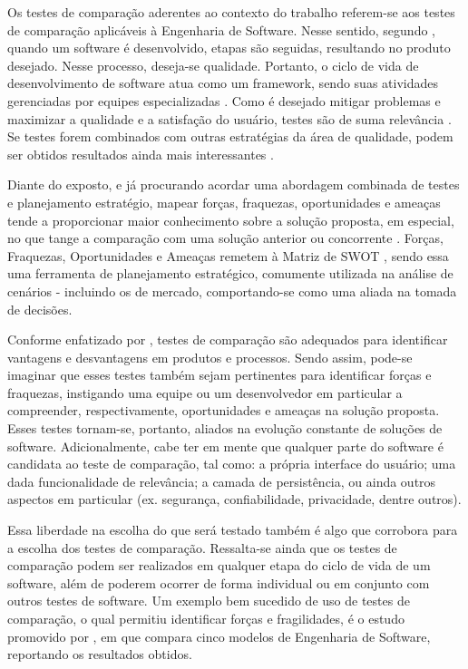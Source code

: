 Os testes de comparação aderentes ao contexto do trabalho referem-se aos testes de comparação aplicáveis à Engenharia de Software. Nesse sentido, segundo , quando um 
software é desenvolvido, etapas são seguidas, resultando no produto desejado. Nesse processo, deseja-se qualidade. Portanto, o ciclo de vida de desenvolvimento de software atua como 
um framework, sendo suas atividades gerenciadas por equipes especializadas \cite{pressman2021}. Como é desejado mitigar problemas e maximizar a qualidade e a satisfação do usuário, testes são de 
suma relevância \cite{delamaro2013}. Se testes forem combinados com outras estratégias da área de qualidade, podem ser obtidos resultados ainda mais interessantes \cite{damo2020} \cite{cintra2022} \cite{akinyemi2020}.

Diante do exposto, e já procurando acordar uma abordagem combinada de testes e planejamento estratégio, mapear forças, fraquezas, oportunidades e ameaças tende a proporcionar maior conhecimento 
sobre a solução proposta, em especial, no que tange a comparação com uma solução anterior ou concorrente \cite{damo2020} \cite{akinyemi2020}. Forças, Fraquezas, Oportunidades e Ameaças remetem à Matriz de SWOT \cite{fernandes2015}, 
sendo essa uma ferramenta de planejamento estratégico, comumente utilizada na análise de cenários - incluindo os de mercado, comportando-se como uma aliada na tomada de decisões. 

Conforme enfatizado por , testes de comparação são adequados para identificar vantagens e desvantagens em produtos e processos. Sendo assim, pode-se imaginar que esses testes também sejam pertinentes para 
identificar forças e fraquezas, instigando uma equipe ou um desenvolvedor em particular a compreender, respectivamente, oportunidades e ameaças na solução proposta. Esses testes tornam-se, portanto, 
aliados na evolução constante de soluções de software. Adicionalmente, cabe ter em mente que qualquer parte do software é candidata ao teste de comparação, tal como: a própria interface do usuário; 
uma dada funcionalidade de relevância; a camada de persistência, ou ainda outros aspectos em particular (ex. segurança, confiabilidade, privacidade, dentre outros).

Essa liberdade na escolha do que será testado também é algo que corrobora para a escolha dos testes de comparação. Ressalta-se ainda que os testes de comparação podem ser realizados em qualquer etapa 
do ciclo de vida de um software, além de poderem ocorrer de forma individual ou em conjunto com outros testes de software. Um exemplo bem sucedido de uso de testes de comparação, o qual permitiu identificar 
forças e fragilidades, é o estudo promovido por , em que compara cinco modelos de Engenharia de Software, reportando os resultados obtidos. 

